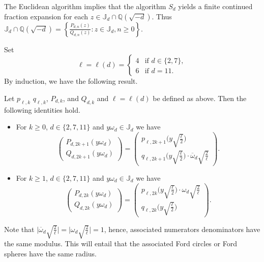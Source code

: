 \documentclass[graybox]{svmult}
\begin{document}
The Euclidean algorithm implies that the algorithm $S_{d}$ yields a finite continued fraction expansion for each $z \in \mathbb J_{d} \cap \mathbb Q(\sqrt{-d})$.  Thus $\mathbb J_{d} \cap \mathbb Q(\sqrt{-d}) = \left\{\tfrac{P_{d, n}(z)}{Q_{d, n}(z)} : z \in \mathbb J_{d}, n\ge 0 \right\}$. 

Set
\begin{equation}\label{eq:lld}
\ell=\ell(d)= \begin{cases} 4 &\text{if } d\in\{2,7\}, \\ 6 &\text{if } d=11. \end{cases}
\end{equation}
By induction, we have the following result.

\begin{proposition}\label{prop:pqPQ}
Let $p_{\ell,k}$ $q_{\ell,k}$, $P_{d,k}$, and $Q_{d,k}$ and $\ell=\ell(d)$ be defined as above. Then the following identities hold.
\begin{itemize}
\item[(i)]\; For $k \ge 0$, $d\in\{2, 7,11\}$ and $y \omega_d \in \mathbb J_{d}$ we have
\[
\begin{pmatrix} P_{d, 2k+1}(y \omega_d) \\  Q_{d, 2k+1}(y \omega_d) 
\end{pmatrix} 
= 
\begin{pmatrix}
p_{\ell, 2k+1}\Big(y \sqrt{\tfrac\ell2}\Big)  \\ q_{\ell, 2k+1}\Big(y \sqrt{\tfrac\ell2}\Big) \cdot
\overline\omega_d \sqrt{\tfrac2\ell}  \end{pmatrix}.
\]
\item[(ii)] \; For $k \ge 1$, $d\in\{2, 7,11\}$ and $y \omega_d \in \mathbb J_{d}$ we have
\[
\begin{pmatrix} P_{d, 2k}(y \omega_d) \\  Q_{d, 2k}(y \omega_d) 
\end{pmatrix} 
=  
\begin{pmatrix}
p_{\ell, 2k}\Big(y \sqrt{\tfrac\ell2}\Big) \cdot
\omega_d\sqrt{\tfrac2\ell}  \\ q_{\ell, 2k}\Big(y \sqrt{\tfrac\ell2}\Big)\end{pmatrix}.
\]
\end{itemize}
\end{proposition} 

Note that $\Big|\overline\omega_d \sqrt{\tfrac2\ell}  \Big| = \Big| \omega_d\sqrt{\tfrac2\ell} \Big|=1$, hence, associated numerators denominators have the same modulus. This will entail that the associated Ford circles or Ford spheres have the same radius.
\end{document}
